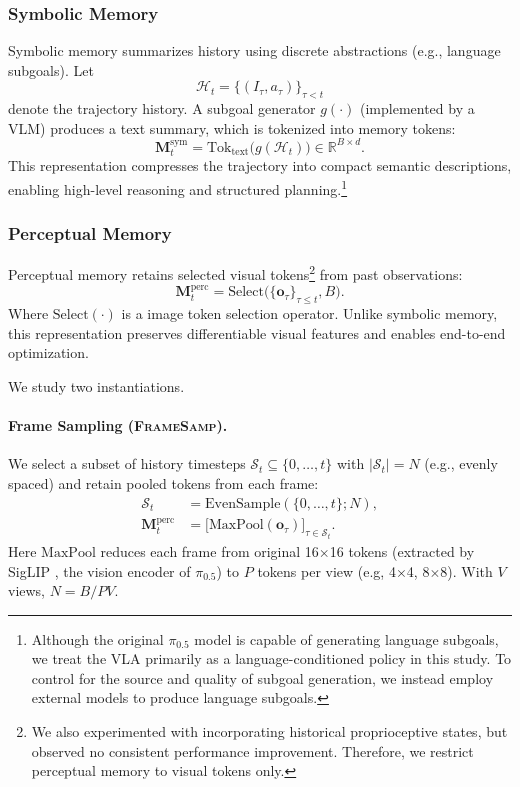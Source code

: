 \subsubsection{Symbolic Memory}

Symbolic memory summarizes history using discrete abstractions (e.g., language subgoals). Let
\[
\mathcal{H}_t=\{(I_\tau,a_\tau)\}_{\tau<t}
\]
denote the trajectory history. A subgoal generator $g(\cdot)$ (implemented by a VLM) produces a text summary, which is tokenized into memory tokens:
\[
\mathbf{M}_t^{\text{sym}}
=
\mathrm{Tok}_{\text{text}}\!\big(g(\mathcal{H}_t)\big)
\in \mathbb{R}^{B \times d}.
\]
This representation compresses the trajectory into compact semantic descriptions, enabling high-level reasoning and structured planning.\footnote{Although the original $\pi_{0.5}$ model is capable of generating language subgoals, we treat the VLA primarily as a language-conditioned policy in this study. To control for the source and quality of subgoal generation, we instead employ external models to produce language subgoals.}

\subsubsection{Perceptual Memory}

Perceptual memory retains selected visual tokens\footnote{We also experimented with incorporating historical proprioceptive states, but observed no consistent performance improvement. Therefore, we restrict perceptual memory to visual tokens only.} from past observations:
\[
\mathbf{M}_t^{\text{perc}}
=
\mathrm{Select}\big(\{\mathbf{o}_\tau\}_{\tau\le t}, B\big).
\]
Where $\mathrm{Select}(\cdot)$ is a image token selection operator.
Unlike symbolic memory, this representation preserves differentiable visual features and enables end-to-end optimization. 

We study two instantiations.

\paragraph{Frame Sampling (\textsc{FrameSamp}).}
We select a subset of history timesteps $\mathcal{S}_t \subseteq \{0,\dots,t\}$ with $|\mathcal{S}_t|=N$ (e.g., evenly spaced) and retain pooled tokens from each frame:
\begin{align}
\mathcal{S}_t &= \mathrm{EvenSample}(\{0,\dots,t\}; N),\\
\mathbf{M}_t^{\text{perc}}
&= \big[\mathrm{MaxPool}(\mathbf{o}_{\tau})\big]_{\tau \in \mathcal{S}_t}.
\end{align}
Here $\mathrm{MaxPool}$ reduces each frame from original 16$\times$16 tokens (extracted by SigLIP \cite{tschannen2025siglip}, the vision encoder of $\pi_{0.5}$) to $P$ tokens per view (e.g, 4$\times$4, 8$\times$8). With $V$ views, $N = B/PV$.


